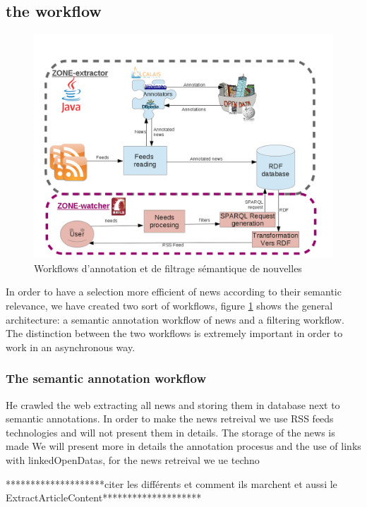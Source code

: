 \documentclass{llncs}
\begin{document}
\subsection{the workflow}
%
\begin{figure}[htb!]
	\begin{centering}
	\includegraphics[width=1\textwidth]{diagramArchi.png}
	\caption{Workflows d'annotation et de filtrage sémantique de nouvelles}
	\label{fig:WF}
	\end{centering}
\end{figure}

In order to have a selection more efficient of news according to their semantic relevance, we have created two sort of workflows, figure \ref{fig:WF} shows the general architecture: a semantic annotation workflow of news and a filtering workflow. The distinction between the two workflows is extremely important in order to work in an asynchronous way.




\subsubsection{The semantic annotation workflow}
He crawled the web extracting all news and storing them in database next to semantic annotations.
In order to make the news retreival we use RSS feeds technologies and will not present them in details. The storage of the news is made 
We will present more in details the annotation procesus and the use of links with linkedOpenDatas, for the news retreival we ue techno

********************citer les différents et comment ils marchent et aussi le ExtractArticleContent********************
\end{document}
